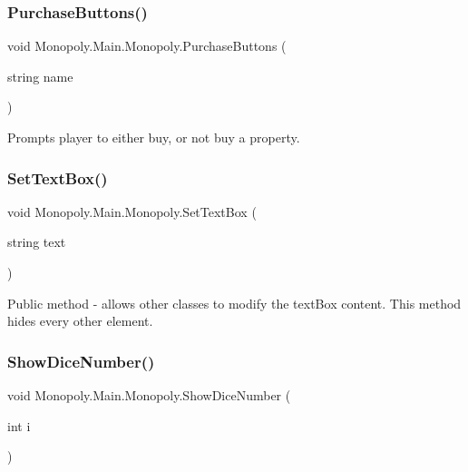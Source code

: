 \subsubsection{\texorpdfstring{Purchase\+Buttons()}{PurchaseButtons()}}
{\footnotesize\ttfamily void Monopoly.\+Main.\+Monopoly.\+Purchase\+Buttons (\begin{DoxyParamCaption}\item[{string}]{name }\end{DoxyParamCaption})\hspace{0.3cm}{\ttfamily [inline]}}

Prompts player to either buy, or not buy a property. \mbox{\label{class_monopoly_1_1_main_1_1_monopoly_a8bdf26b07f8ab71c8bacf754095b4cc7}} 
\subsubsection{\texorpdfstring{Set\+Text\+Box()}{SetTextBox()}}
{\footnotesize\ttfamily void Monopoly.\+Main.\+Monopoly.\+Set\+Text\+Box (\begin{DoxyParamCaption}\item[{string}]{text }\end{DoxyParamCaption})\hspace{0.3cm}{\ttfamily [inline]}}

Public method -\/ allows other classes to modify the text\+Box content. This method hides every other element. \mbox{\label{class_monopoly_1_1_main_1_1_monopoly_a6c2b32e988efdb04b4d2e8728b904642}} 
\subsubsection{\texorpdfstring{Show\+Dice\+Number()}{ShowDiceNumber()}}
{\footnotesize\ttfamily void Monopoly.\+Main.\+Monopoly.\+Show\+Dice\+Number (\begin{DoxyParamCaption}\item[{int}]{i }\end{DoxyParamCaption})\hspace{0.3cm}{\ttfamily [inline]}}

